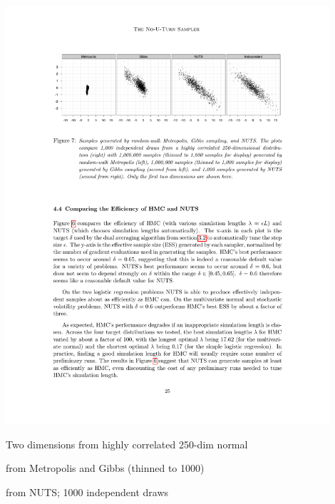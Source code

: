 \documentclass[9pt]{report}
\begin{document}
%
\begin{center}
\includegraphics[width=0.9\textwidth]{img/nuts-vs.pdf}
\end{center}
\begin{subitemize}
\item Two dimensions from highly correlated 250-dim normal
\item {} from Metropolis and Gibbs (thinned to 1000)
\item {} from NUTS; 1000 independent draws
\end{subitemize}
\end{document}
